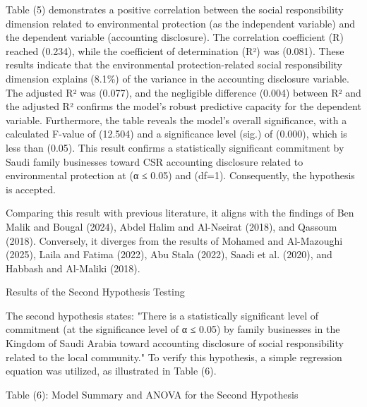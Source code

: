 \documentclass{default}
\begin{document}
Table (5) demonstrates a positive correlation between the social responsibility dimension related to environmental protection (as the independent variable) and the dependent variable (accounting disclosure). The correlation coefficient (R) reached (0.234), while the coefficient of determination (R²) was (0.081). These results indicate that the environmental protection-related social responsibility dimension explains (8.1\%) of the variance in the accounting disclosure variable. The adjusted R² was (0.077), and the negligible difference (0.004) between R² and the adjusted R² confirms the model’s robust predictive capacity for the dependent variable. Furthermore, the table reveals the model's overall significance, with a calculated F-value of (12.504) and a significance level (sig.) of (0.000), which is less than (0.05). This result confirms a statistically significant commitment by Saudi family businesses toward CSR accounting disclosure related to environmental protection at (α ≤ 0.05) and (df=1). Consequently, the hypothesis is accepted.

Comparing this result with previous literature, it aligns with the findings of Ben Malik and Bougal (2024), Abdel Halim and Al-Nseirat (2018), and Qassoum (2018). Conversely, it diverges from the results of Mohamed and Al-Mazoughi (2025), Laila and Fatima (2022), Abu Stala (2022), Saadi et al. (2020), and Habbash and Al-Maliki (2018).

Results of the Second Hypothesis Testing

The second hypothesis states: "There is a statistically significant level of commitment (at the significance level of α ≤ 0.05) by family businesses in the Kingdom of Saudi Arabia toward accounting disclosure of social responsibility related to the local community." To verify this hypothesis, a simple regression equation was utilized, as illustrated in Table (6).

Table (6): Model Summary and ANOVA for the Second Hypothesis

\begin{table}[htbp]
\centering
{}
\caption{}

\end{table}
\end{document}
